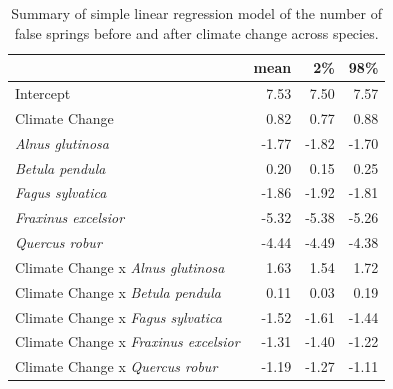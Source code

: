 \documentclass{article}\usepackage[]{graphicx}\usepackage[]{color}
\begin{document}
\begin{table}[H]
\centering
\caption{Summary of simple linear regression model of the number of false springs before and after climate change across species.} 
\label{tab:simpfs}
\begin{tabular}{lrrr}
  \hline
 & mean & 2\% & 98\% \\ 
  \hline
Intercept & 7.53 & 7.50 & 7.57 \\ 
  Climate Change & 0.82 & 0.77 & 0.88 \\ 
  \textit{Alnus glutinosa} & -1.77 & -1.82 & -1.70 \\ 
  \textit{Betula pendula} & 0.20 & 0.15 & 0.25 \\ 
  \textit{Fagus sylvatica} & -1.86 & -1.92 & -1.81 \\ 
  \textit{Fraxinus excelsior} & -5.32 & -5.38 & -5.26 \\ 
  \textit{Quercus robur} & -4.44 & -4.49 & -4.38 \\ 
  Climate Change x \textit{Alnus glutinosa} & 1.63 & 1.54 & 1.72 \\ 
  Climate Change x \textit{Betula pendula} & 0.11 & 0.03 & 0.19 \\ 
  Climate Change x \textit{Fagus sylvatica} & -1.52 & -1.61 & -1.44 \\ 
  Climate Change x \textit{Fraxinus excelsior} & -1.31 & -1.40 & -1.22 \\ 
  Climate Change x \textit{Quercus robur} & -1.19 & -1.27 & -1.11 \\ 
   \hline
\end{tabular}
\end{table}
\end{document}
